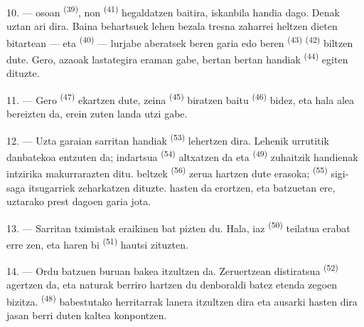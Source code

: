 10. ---  osoan \textsuperscript{(39)}, non 
\textsuperscript{(41)} hegaldatzen baitira, iskanbila handia dago. Denak uztan ari
dira. Baina behartsuek lehen bezala tresna zaharrei heltzen dieten bitartean ---
 eta  \textsuperscript{(40)} --- lurjabe
aberatsek beren garia edo beren  \textsuperscript{(43)}
 \textsuperscript{(42)} biltzen dute. Gero, azaoak lastategira
eraman gabe, bertan bertan  handiak \textsuperscript{(44)} egiten
dituzte.

11. --- Gero  \textsuperscript{(47)} ekartzen dute, zeina
 \textsuperscript{(45)} biratzen baitu 
\textsuperscript{(46)} bidez, eta hala alea  bereizten da, erein
zuten landa utzi gabe.

\VUsaut{5.0mm}
\VUsaut{3.4mm}

12. --- Uzta garaian sarritan  handiak \textsuperscript{(53)}
lehertzen dira. Lehenik urrutitik  danbatekoa entzuten da;
 indartsua \textsuperscript{(54)} altxatzen da eta
 \textsuperscript{(49)} zuhaitzik handienak intzirika makurrarazten
ditu.  beltzek \textsuperscript{(56)} zerua hartzen dute
erasoka;  \textsuperscript{(55)} sigi-saga itsugarriek
zeharkatzen dituzte.  hasten da erortzen, eta batzuetan
 ere, uztarako prest dagoen garia jota.

13. --- Sarritan tximistak eraikinen bat pizten du. Hala, iaz 
\textsuperscript{(50)} teilatua erabat erre zen, eta haren bi 
\textsuperscript{(51)} hautsi zituzten.

14. --- Ordu batzuen buruan bakea itzultzen da. Zeruertzean 
distiratsua \textsuperscript{(52)} agertzen da, eta naturak berriro hartzen du
denboraldi batez etenda zegoen bizitza. 
\textsuperscript{(48)} babestutako herritarrak lanera itzultzen dira eta ausarki
hasten dira jasan berri duten kaltea konpontzen.

\VUsaut{6.0mm}
\VUsaut{3.6mm}

\VUsaut{1.4mm}
\VUsaut{4.0mm}

